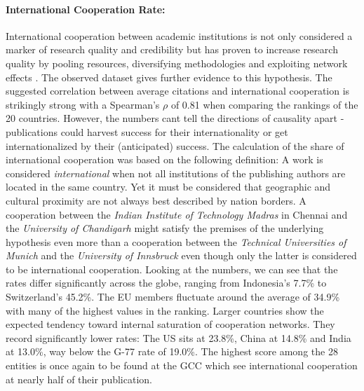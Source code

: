 \documentclass{article}
\begin{document}
	\paragraph{International Cooperation Rate:} International cooperation between academic institutions is not only considered a marker of research quality and credibility but has proven to increase research quality by pooling resources, diversifying methodologies and exploiting network effects \cite{kohus2022influence}. The observed dataset gives further evidence to this hypothesis. The suggested correlation between average citations and international cooperation is strikingly strong with a Spearman's $\rho$ of 0.81 when comparing the rankings of the 20 countries. However, the numbers cant tell the directions of causality apart - publications could harvest success for their internationality or get internationalized by their (anticipated) success. The calculation of the share of international cooperation was based on the following definition: A work is considered \textit{international} when not all institutions of the publishing authors are located in the same country. Yet it must be considered that geographic and cultural proximity are not always best described by nation borders. A cooperation between the \textit{Indian Institute of Technology Madras} in Chennai and the \textit{University of Chandigarh} might satisfy the premises of the underlying hypothesis even more than a cooperation between the \textit{Technical Universities of Munich} and the \textit{University of Innsbruck} even though only the latter is considered to be international cooperation. Looking at the numbers, we can see that the rates differ significantly across the globe, ranging from Indonesia's 7.7\% to Switzerland's 45.2\%. The EU members fluctuate around the average of 34.9\% with many of the highest values in the ranking. Larger countries show the expected tendency toward internal saturation of cooperation networks. They record significantly lower rates: The US sits at 23.8\%, China at 14.8\% and India at 13.0\%, way below the G-77 rate of 19.0\%. The highest score among the 28 entities is once again to be found at the GCC which see international cooperation at nearly half of their publication. 
	
\end{document}
